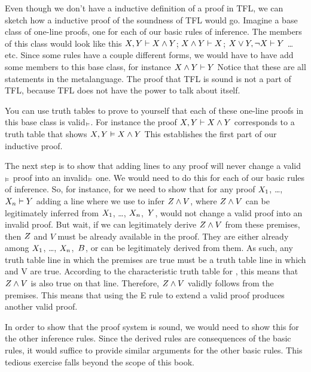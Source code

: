 Even though we don't have a inductive definition of a proof in TFL, we can sketch how a inductive proof of the soundness of TFL would go. Imagine a base class of one-line proofs, one for each of our
basic
rules of inference. The members of this class would look like this $X, Y \vdash  X \mathbin{\wedge} Y$; $X \mathbin{\wedge} Y \vdash X$; $X \vee Y, \neg X \vdash  Y$ \ldots{} etc. Since some rules have a couple different forms, we would have to have add some members to this base class, for instance $X \mathbin{\wedge} Y \vdash  Y$ Notice that these are all statements in the metalanguage. The proof that TFL is sound is not a part of TFL, because TFL does not have the power to talk about itself.

You can use truth tables to prove to yourself that each of these one-line proofs in this base class is valid$_{\vDash}$. For instance the proof $X, Y \vdash X \mathbin{\wedge} Y$ corresponds to a truth table that shows $X, Y \vDash  X \mathbin{\wedge} Y$ This establishes the first part of our inductive proof.

The next step is to show that adding lines to any proof will never change a valid$_{\vDash}$ proof into an invalid$_{\vDash}$ one. We would need to do this for each of our
basic rules of inference. So, for instance, for  we need to show that for any proof $X_{1}$, \dots, $X_{n} \vdash  Y$ adding a line where we use  to infer $Z \mathbin{\wedge} V$, where $Z \mathbin{\wedge} V$ can be legitimately inferred from $X_{1}$, \dots, $X_{n}$,~$Y$, would not change a valid proof into an invalid proof. But wait, if we can legitimately derive $Z \mathbin{\wedge} V$ from these premises, then $Z$ and $V$ must be already available in the proof. They are either already among $X_{1}$, \dots, $X_{n}$,~$B$, or can be legitimately derived from them. As such, any truth table line in which the premises are true must be a truth table line in which \metaZ and V are true. According to the characteristic truth table for \eand, this means that $Z \mathbin{\wedge} V$ is also true on that line. Therefore, $Z \mathbin{\wedge} V$ validly follows from the premises. This means that using the {\eand}E rule to extend a valid proof produces another valid proof.

In order to show that the proof system is sound, we would need to show this for the other inference rules. Since the derived rules are consequences of the basic rules, it would suffice to provide similar arguments for the
other basic rules. This tedious exercise falls beyond the scope of this book.

